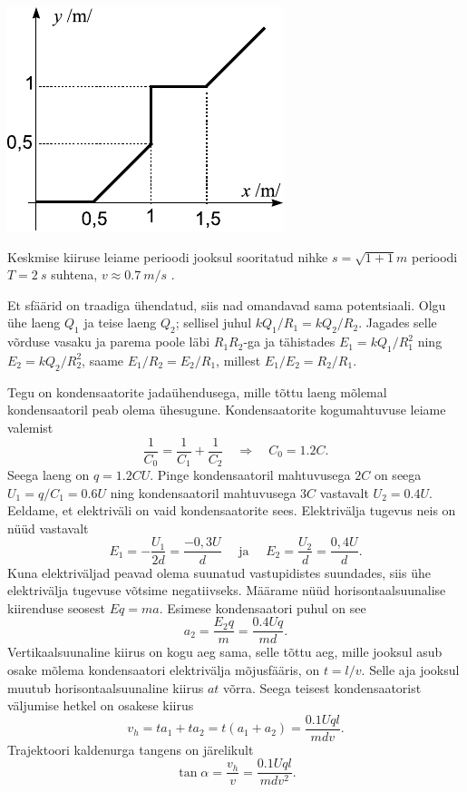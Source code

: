 \documentclass[10pt, twoside]{article}
\begin{document}
{\begin{center}
	\includegraphics[width=0.6\linewidth]{2009-v2g-06-lah}
\end{center}

Keskmise kiiruse leiame perioodi jooksul sooritatud nihke $s = \sqrt{1+1}\si{m}$ perioodi $T = \SI{2}{s}$ suhtena, $v \approx \SI{0,7}{m/s}$ .
\probend
\bigskip


\solu
Et sfäärid on traadiga ühendatud, siis nad omandavad sama potentsiaali. Olgu ühe laeng $Q_1$ ja teise laeng $Q_2$;
sellisel juhul $kQ_1/R_1=kQ_2/R_2$. Jagades selle võrduse vasaku ja parema poole läbi $R_1R_2$-ga ja tähistades $E_1=kQ_1/R_1^2$ ning
$E_2=kQ_2/R_2^2$, saame $E_1/R_2 = E_2/R_1$, millest $E_1/E_2=R_2/R_1$.
\probend
\bigskip


\solu
Tegu on kondensaatorite jadaühendusega, mille tõttu laeng mõlemal kondensaatoril peab olema ühesugune. Kondensaatorite kogumahtuvuse leiame valemist 
\[
\frac{1}{C_{0}}=\frac{1}{C_{1}}+\frac{1}{C_{2}} \quad \Rightarrow \quad C_{0}=\num{1,2} C.
\]
Seega laeng on $q = \num{1,2}CU$. Pinge kondensaatoril mahtuvusega $2C$ on seega $U_1 = q/C_1 = \num{0,6}U$ ning kondensaatoril mahtuvusega $3C$ vastavalt $U_2 = \num{0,4}U$. Eeldame, et elektriväli on vaid kondensaatorite sees. Elektrivälja tugevus neis on nüüd vastavalt
\[
E_{1}=-\frac{U_{1}}{2 d}=\frac{-0,3 U}{d} \quad \text { ja } \quad E_{2}=\frac{U_{2}}{d}=\frac{0,4 U}{d}.
\]
Kuna elektriväljad peavad olema suunatud vastupidistes suundades, siis ühe elektrivälja tugevuse võtsime negatiivseks. Määrame nüüd horisontaalsuunalise kiirenduse seosest $Eq = ma$. Esimese kondensaatori puhul on see
\[
a_{2}=\frac{E_{2} q}{m}=\frac{\num{0,4} U q}{m d}.
\]
Vertikaalsuunaline kiirus on kogu aeg sama, selle tõttu aeg, mille jooksul asub osake mõlema kondensaatori elektrivälja mõjusfääris, on $t = l/v$. Selle aja jooksul muutub horisontaalsuunaline kiirus $at$ võrra. Seega teisest kondensaatorist väljumise hetkel on osakese kiirus
\[
v_{h}=t a_{1}+t a_{2}=t\left(a_{1}+a_{2}\right)=\frac{\num{0,1} U q l}{m d v}.
\]
Trajektoori kaldenurga tangens on järelikult
\[
\tan \alpha = \frac{v_h}{v} = \frac{\num{0,1}Uql}{mdv^2}.
\]
\probend
\bigskip

}
\end{document}
